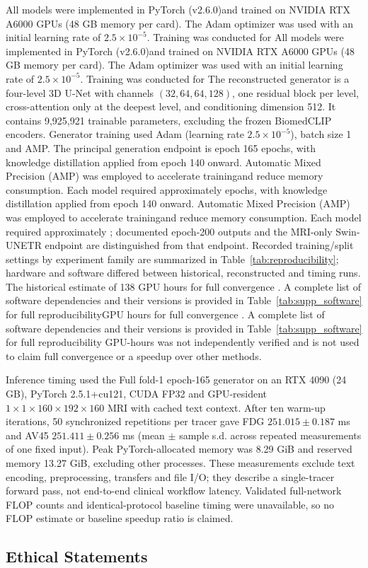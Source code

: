 \documentclass{article}
\providecommand{\DIFaddtex}[1]{{\protect\color{blue} \sf #1}} %
\providecommand{\DIFdeltex}[1]{{\protect\color{red} \ifmmode #1\else\scriptsize #1\fi}} %
\providecommand{\DIFaddbegin}{} %
\providecommand{\DIFaddend}{} %
\providecommand{\DIFdelbegin}{} %
\providecommand{\DIFdelend}{} %
\providecommand{\DIFadd}[1]{\texorpdfstring{\DIFaddtex{#1}}{#1}} %
\providecommand{\DIFdel}[1]{\texorpdfstring{\DIFdeltex{#1}}{}} %
\newcommand{\DIFscaledelfig}{0.5}
\newlength{\DIFdelgraphicswidth} %
\newlength{\DIFdelgraphicsheight} %
\newcommand{\DIFaddincludegraphics}[2][]{{\color{blue}\fbox{\DIFOincludegraphics[#1]{#2}}}} %
\newcommand{\DIFdelincludegraphics}[2][]{%
\sbox{\DIFdelgraphicsbox}{\DIFOincludegraphics[#1]{#2}}%
\settoboxwidth{\DIFdelgraphicswidth}{\DIFdelgraphicsbox} %
\settoboxtotalheight{\DIFdelgraphicsheight}{\DIFdelgraphicsbox} %
\scalebox{\DIFscaledelfig}{%
\parbox[b]{\DIFdelgraphicswidth}{\usebox{\DIFdelgraphicsbox}\\[-\baselineskip] \rule{\DIFdelgraphicswidth}{0em}}\llap{\resizebox{\DIFdelgraphicswidth}{\DIFdelgraphicsheight}{%
\setlength{\unitlength}{\DIFdelgraphicswidth}%
\begin{picture}(1,1)%
\thicklines\linethickness{2pt} %
{\color[rgb]{1,0,0}\put(0,0){\framebox(1,1){}}}%
{\color[rgb]{1,0,0}\put(0,0){\line( 1,1){1}}}%
{\color[rgb]{1,0,0}\put(0,1){\line(1,-1){1}}}%
\end{picture}%
}\hspace*{3pt}}} %
} %
\DeclareRobustCommand{\DIFaddbegin}{\DIFOaddbegin \let\includegraphics\DIFaddincludegraphics} %
\DeclareRobustCommand{\DIFaddend}{\DIFOaddend \let\includegraphics\DIFOincludegraphics} %
\DeclareRobustCommand{\DIFdelbegin}{\DIFOdelbegin \let\includegraphics\DIFdelincludegraphics} %
\DeclareRobustCommand{\DIFdelend}{\DIFOaddend \let\includegraphics\DIFOincludegraphics} %
\begin{document}
\DIFdelbegin \DIFdel{All models were implemented in PyTorch (v2.6.0)and trained on NVIDIA RTX A6000 GPUs (48 GB memory per card). The Adam optimizer was used with an initial learning rate of $2.5 \times 10^{-5}$. Training was conducted for }\DIFdelend \DIFaddbegin \DIFadd{The reconstructed generator is a four-level 3D U-Net with channels $(32,64,64,128)$, one residual block per level, cross-attention only at the deepest level, and conditioning dimension 512. It contains 9,925,921 trainable parameters, excluding the frozen BiomedCLIP encoders. Generator training used Adam (learning rate $2.5\times10^{-5}$), batch size 1 and AMP. The principal generation endpoint is epoch }\DIFaddend 165\DIFdelbegin \DIFdel{epochs, with knowledge distillation applied from epoch 140 onward. Automatic Mixed Precision (AMP) was employed to accelerate trainingand reduce memory consumption. Each model required approximately }\DIFdelend \DIFaddbegin \DIFadd{; documented epoch-200 outputs and the MRI-only Swin-UNETR endpoint are distinguished from that endpoint. Recorded training/split settings by experiment family are summarized in Table~\ref{tab:reproducibility}; hardware and software differed between historical, reconstructed and timing runs. The historical estimate of }\DIFaddend 138 \DIFdelbegin \DIFdel{GPU hours for full convergence . A complete list of software dependencies and their versions is provided in Table~\ref{tab:supp_software} for full reproducibility}\DIFdelend \DIFaddbegin \DIFadd{GPU-hours was not independently verified and is not used to claim full convergence or a speedup over other methods.
}

\DIFadd{Inference timing used the Full fold-1 epoch-165 generator on an RTX 4090 (24 GB), PyTorch 2.5.1+cu121, CUDA FP32 and GPU-resident $1\times1\times160\times192\times160$ MRI with cached text context. After ten warm-up iterations, 50 synchronized repetitions per tracer gave FDG $251.015\pm0.187$ ms and AV45 $251.411\pm0.256$ ms (mean $\pm$ sample s.d. across repeated measurements of one fixed input). Peak PyTorch-allocated memory was 8.29 GiB and reserved memory 13.27 GiB, excluding other processes. These measurements exclude text encoding, preprocessing, transfers and file I/O; they describe a single-tracer forward pass, not end-to-end clinical workflow latency. Validated full-network FLOP counts and identical-protocol baseline timing were unavailable, so no FLOP estimate or baseline speedup ratio is claimed}\DIFaddend .

\subsection{Ethical Statements}
\end{document}
